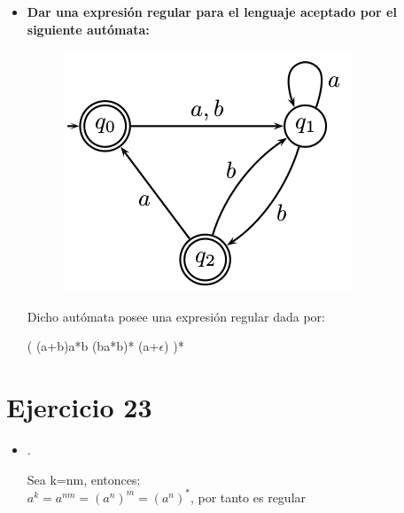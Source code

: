 \begin{itemize}
	\item \textbf{Dar una expresión regular para el lenguaje aceptado por el siguiente autómata:}
	
	\begin{figure}[h]
		\centering
		\includegraphics[scale=0.5]{22.png}
	\end{figure}
	
	Dicho autómata posee una expresión regular dada por:
	
	( (a+b)a*b (ba*b)* (a+$\epsilon$) )*
	
\end{itemize}







\newpage
\section{Ejercicio 23}
\begin{itemize}
	\item {}.
	\begin{center}
		Sea k=nm, entonces: \\
		$a^{k} = a^{nm} = (a^{n})^{m} = (a^{n})^{*} $, por tanto es regular
	\end{center}
\end{itemize}



